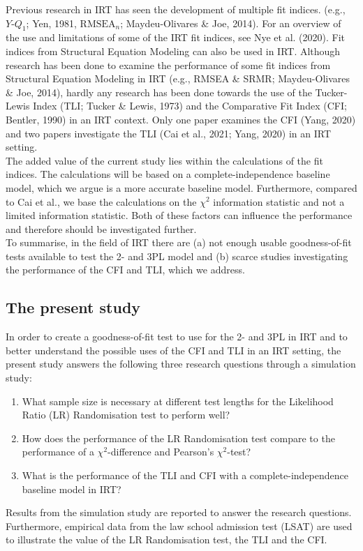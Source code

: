 \documentclass[Royal,sageapa,times,doublespace]{sagej}
\begin{document}
\indent Previous research in IRT has seen the development of multiple fit indices. (e.g., $Y\text{-}Q_1$; Yen, 1981, $\text{RMSEA}_n$; Maydeu-Olivares \& Joe, 2014). For an overview of the use and limitations of some of the IRT fit indices, see Nye et al. (2020). Fit indices from Structural Equation Modeling can also be used in IRT. Although research has been done to examine the performance of some fit indices from Structural Equation Modeling in IRT (e.g., RMSEA \& SRMR; Maydeu-Olivares \& Joe, 2014), hardly any research has been done towards the use of the Tucker-Lewis Index (TLI; Tucker \& Lewis, 1973) and the Comparative Fit Index (CFI; Bentler, 1990) in an IRT context. Only one paper examines the CFI (Yang, 2020) and two papers investigate the TLI (Cai et al., 2021; Yang, 2020) in an IRT setting. \\
\indent The added value of the current study lies within the calculations of the fit indices. The calculations will be based on a complete-independence baseline model, which we argue is a more accurate baseline model. Furthermore, compared to Cai et al., we base the calculations on the $\chi^2$ information statistic and not a limited information statistic. Both of these factors can influence the performance and therefore should be investigated further. \\
\indent To summarise, in the field of IRT there are (a) not enough usable goodness-of-fit tests available to test the 2- and 3PL model and (b) scarce studies investigating the performance of the CFI and TLI, which we address.

\subsection{The present study}
In order to create a goodness-of-fit test to use for the 2- and 3PL in IRT and to better understand the possible uses of the CFI and TLI in an IRT setting, the present study answers the following three research questions through a simulation study:
\begin{enumerate}
\item{What sample size is necessary at different test lengths for the Likelihood Ratio (LR) Randomisation test to perform well?}
\item{How does the performance of the LR Randomisation test compare to the performance of a $\chi^2$-difference and Pearson's $\chi^2$-test?}
\item{What is the performance of the TLI and CFI with a complete-independence baseline model in IRT?}
\end{enumerate}
Results from the simulation study are reported to answer the research questions. Furthermore, empirical data from the law school admission test (LSAT) are used to illustrate the value of the LR Randomisation test, the TLI and the CFI.
\end{document}
